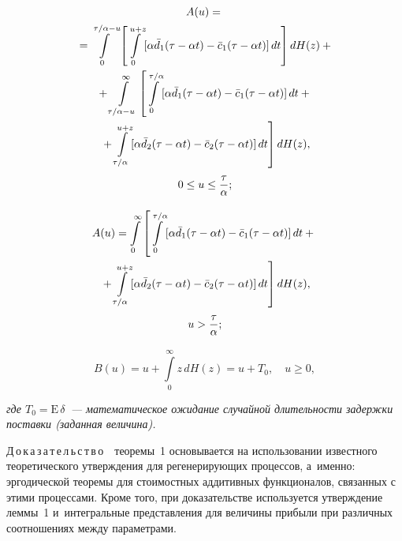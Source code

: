 \begin{multicols}{2}
\vspace*{-6pt}

\noindent
\begin{multline}
        A(u)={}\\
        {}=\int\limits_0^{\tau/\alpha-u}\left[\int\limits_0^{u+z}[\alpha\bar{d}_1(\tau-\alpha t)-\bar{c}_1(\tau-\alpha 
t)] \,dt\right] dH(z)+{}\\
{}+\int\limits_{\tau/\alpha-u}^\infty\left[\int\limits_0^{\tau/\alpha}[\alpha\bar{d}_1(\tau-\alpha t)-
\bar{c}_1(\tau-\alpha t)] \,dt+{}\right.\\
\left.{}+\int\limits_{\tau/\alpha}^{u+z}[\alpha\bar{d}_2(\tau-\alpha t)-\bar{c}_2(\tau-
\alpha t)]\,dt\right] dH(z),\\
0\leq u\leq\displaystyle\frac{\displaystyle \tau\mathstrut}{\displaystyle \alpha\mathstrut};
\label{e12-sh}
\end{multline}


\noindent
\begin{multline}
A(u)=\int\limits_0^\infty\left[\int\limits_0^{\tau/\alpha}[\alpha\bar{d}_1(\tau
-\alpha t)-\bar{c}_1(\tau-\alpha t)] \,dt+{}\right.\\
\left.{}+\int\limits_{\tau/\alpha}^{u+z}[\alpha\bar{d}_2(\tau-\alpha t)-\bar{c}_2(\tau-\alpha t)]\,dt\right]dH(z),\\
u> \displaystyle\frac{\displaystyle \tau\mathstrut}{\displaystyle \alpha\mathstrut};
\label{e13-sh}
\end{multline}

\vspace*{-12pt}

\noindent
\begin{equation}
    B(u)=u+\int\limits_0^\infty z\, dH(z)=u+T_0,\quad u\geq 0,
\label{e14-sh}
\end{equation}

\noindent
\textit{где $T_0=\mathrm{E}\,\delta$~--- математическое ожидание случайной длительности 
задержки поставки (заданная величина).}

\smallskip

\noindent
Д\,о\,к\,а\,з\,а\,т\,е\,л\,ь\,с\,т\,в\,о\ \ тео\-ре\-мы~1 основывается на использовании известного теоретического 
утверж\-де\-ния для регенерирующих процессов, а~именно: эргодической тео\-ре\-мы для 
стоимостных аддитивных функционалов, связанных с этими процессами. Кроме того, 
при доказательстве используется утверж\-де\-ние леммы~1 и~интегральные пред\-став\-ле\-ния 
для величины прибыли при различных соотношениях между параметрами.

\smallskip


\end{multicols}
